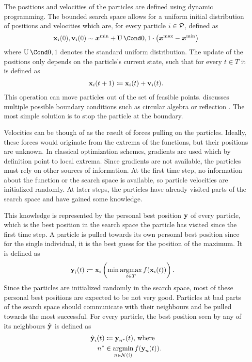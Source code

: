 The positions and velocities of the particles are defined using dynamic programming.
The bounded search space allows for a uniform initial distribution of positions and velocities which are, for every particle $i \in \operatorname{\mathcal{P}}$, defined as
\begin{align}
    \Pos_i(0), \Vel_i(0) \sim \mat{x^{\text{min}}} + \Uniform{0, 1} \cdot \left( \mat{x^{\text{max}}} - \mat{x^{\text{min}}} \right)
\end{align}
where $\Uniform{0, 1}$ denotes the standard uniform distribution.
The update of the positions only depends on the particle's current state, such that for every $t \in T$ it is defined as
\begin{align}
    \operatorname{\mathbf{x}}_i(t+1) \coloneqq \operatorname{\mathbf{x}}_i(t) + \operatorname{\mathbf{v}}_i(t).
\end{align}
This operation can move particles out of the set of feasible points.
\citeauthor{engelbrecht_fundamentals_2006} discusses multiple possible boundary conditions such as circular algebra or reflection \cite{engelbrecht_fundamentals_2006}.
The most simple solution is to stop the particle at the boundary.

Velocities can be though of as the result of forces pulling on the particles.
Ideally, these forces would originate from the extrema of the functions, but their positions are unknown.
In classical optimization schemes, gradients are used which by definition point to local extrema.
Since gradients are not available, the particles must rely on other sources of information.
At the first time step, no information about the function or the search space is available, so particle velocities are initialized randomly.
At later steps, the particles have already visited parts of the search space and have gained some knowledge.

This knowledge is represented by the personal best position $\operatorname{\mathbf{y}}$ of every particle, which is the best position in the search space the particle has visited since the first time step.
A particle is pulled towards its own personal best position since for the single individual, it is the best guess for the position of the maximum.
It is defined as
\begin{align}
    \operatorname{\mathbf{y}}_i(t) &\coloneqq \operatorname{\mathbf{x}}_i \left(\min\operatorname*{argmax}_{t \in T} f(\operatorname{\mathbf{x}}_i(t)) \right).
\end{align}
Since the particles are initialized randomly in the search space, most of these personal best positions are expected to be not very good.
Particles at bad parts of the search space should communicate with their neighbours and be pulled towards the most successful.
For every particle, the best position seen by any of its neighbours $\operatorname{\hat{\operatorname{\mathbf{y}}}}$ is defined as
\begin{align}
    \operatorname{\hat{\operatorname{\mathbf{y}}}}_i(t) &\coloneqq \operatorname{\mathbf{y}}_{n^\ast}(t) \text{, where} \\
    n^\ast &\in \operatorname*{argmin}_{n \in \operatorname{\mathcal{N}}(i)} f(\operatorname{\mathbf{y}}_n(t)).
\end{align}

